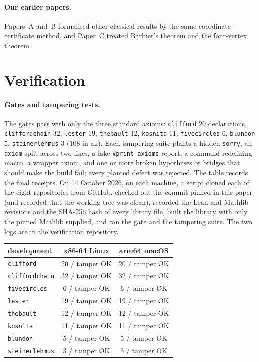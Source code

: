 \documentclass[11pt]{article}
\theoremstyle{definition}
\theoremstyle{remark}
\newcommand{\lean}[1]{\texttt{#1}}
\begin{document}
\paragraph{Our earlier papers.} Papers~A \cite{paperA} and~B \cite{paperB} formalised other classical
results by the same coordinate-certificate method, and Paper~C \cite{paperC} treated Barbier's theorem
and the four-vertex theorem.

\section{Verification}\label{sec:verify}

\paragraph{Gates and tampering tests.} The gates pass with only the three standard axioms:
\lean{clifford} 20 declarations, \lean{cliffordchain} 32, \lean{lester} 19, \lean{thebault} 12,
\lean{kosnita} 11, \lean{fivecircles} 6, \lean{blundon} 5, \lean{steinerlehmus} 3 (108 in all). Each
tampering suite plants a hidden \lean{sorry}, an \lean{axiom} split across two lines, a fake
\lean{\#print axioms} report, a command-redefining macro, a wrapper axiom, and one or more broken
hypotheses or bridges that should make the build fail; every planted defect was rejected.
The table records the final receipts. On 14 October 2026, on each machine, a script cloned each of the
eight repositories from GitHub, checked out the commit pinned in this paper (and recorded that the
working tree was clean), recorded the Lean and Mathlib revisions and the SHA-256 hash of every library
file, built the library with only the pinned Mathlib supplied, and ran the gate and the tampering suite.
The two logs are in the verification repository.
\begin{center}\small
\begin{tabular}{lcc}
\toprule
development & x86-64 Linux & arm64 macOS\\
\midrule
\lean{clifford} & 20 / tamper OK & 20 / tamper OK\\
\lean{cliffordchain} & 32 / tamper OK & 32 / tamper OK\\
\lean{fivecircles} & 6 / tamper OK & 6 / tamper OK\\
\lean{lester} & 19 / tamper OK & 19 / tamper OK\\
\lean{thebault} & 12 / tamper OK & 12 / tamper OK\\
\lean{kosnita} & 11 / tamper OK & 11 / tamper OK\\
\lean{blundon} & 5 / tamper OK & 5 / tamper OK\\
\lean{steinerlehmus} & 3 / tamper OK & 3 / tamper OK\\
\bottomrule
\end{tabular}
\end{center}
\end{document}
